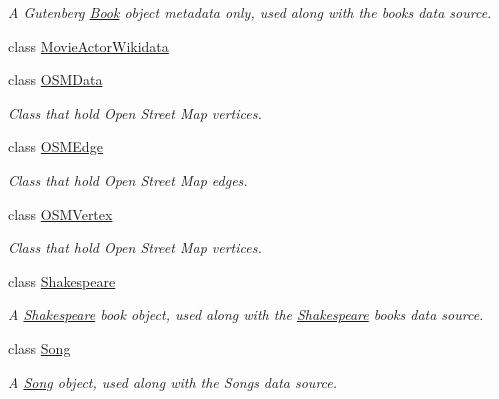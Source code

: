 \begin{DoxyCompactItemize}
\begin{DoxyCompactList}\small\item\em A Gutenberg \mbox{\hyperlink{classbridges_1_1dataset_1_1_book}{Book}} object metadata only, used along with the books data source. \end{DoxyCompactList}\item 
class \mbox{\hyperlink{classbridges_1_1dataset_1_1_movie_actor_wikidata}{Movie\+Actor\+Wikidata}}
\item 
class \mbox{\hyperlink{classbridges_1_1dataset_1_1_o_s_m_data}{O\+S\+M\+Data}}
\begin{DoxyCompactList}\small\item\em Class that hold Open Street Map vertices. \end{DoxyCompactList}\item 
class \mbox{\hyperlink{classbridges_1_1dataset_1_1_o_s_m_edge}{O\+S\+M\+Edge}}
\begin{DoxyCompactList}\small\item\em Class that hold Open Street Map edges. \end{DoxyCompactList}\item 
class \mbox{\hyperlink{classbridges_1_1dataset_1_1_o_s_m_vertex}{O\+S\+M\+Vertex}}
\begin{DoxyCompactList}\small\item\em Class that hold Open Street Map vertices. \end{DoxyCompactList}\item 
class \mbox{\hyperlink{classbridges_1_1dataset_1_1_shakespeare}{Shakespeare}}
\begin{DoxyCompactList}\small\item\em A \mbox{\hyperlink{classbridges_1_1dataset_1_1_shakespeare}{Shakespeare}} book object, used along with the \mbox{\hyperlink{classbridges_1_1dataset_1_1_shakespeare}{Shakespeare}} books data source. \end{DoxyCompactList}\item 
class \mbox{\hyperlink{classbridges_1_1dataset_1_1_song}{Song}}
\begin{DoxyCompactList}\small\item\em A \mbox{\hyperlink{classbridges_1_1dataset_1_1_song}{Song}} object, used along with the Songs data source. \end{DoxyCompactList}\end{DoxyCompactItemize}

